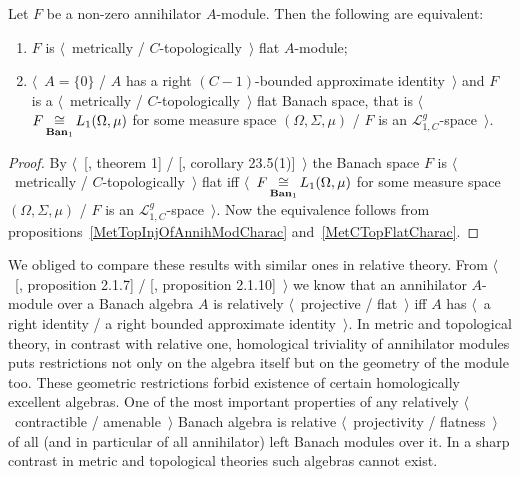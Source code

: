 \begin{proposition}\label{MetTopFlatAnnihModCharac} Let $F$ be a non-zero
annihilator $A$-module. Then the following are equivalent:

\begin{enumerate}[label = (\roman*)]
    \item $F$ is $\langle$~metrically / $C$-topologically~$\rangle$ flat
    $A$-module;

    \item $\langle$~$A= \{0 \}$ / $A$ has a right $(C-1)$-bounded approximate
    identity~$\rangle$ and $F$ is a $\langle$~metrically /
    $C$-topologically~$\rangle$ flat Banach space, that is
    $\langle$~$F\mathop{\mathbin{\cong}}\limits_{\mathbf{Ban}_1}L_1(\Omega,\mu)$ for some measure space
    $(\Omega, \Sigma, \mu)$ / $F$ is an $\mathscr{L}_{1,C}^g$-space~$\rangle$.
\end{enumerate}
\end{proposition}
\begin{proof} By $\langle$~[\cite{GrothMetrProjFlatBanSp}, theorem 1] /
[\cite{DefFloTensNorOpId}, corollary 23.5(1)]~$\rangle$ the Banach space $F$ is
$\langle$~metrically / $C$-topologically~$\rangle$ flat iff
$\langle$~$F\mathop{\mathbin{\cong}}\limits_{\mathbf{Ban}_1}L_1(\Omega,\mu)$ for some measure space
$(\Omega, \Sigma, \mu)$ / $F$ is an $\mathscr{L}_{1,C}^g$-space~$\rangle$. Now
the equivalence follows from propositions~\ref{MetTopInjOfAnnihModCharac}
and~\ref{MetCTopFlatCharac}.
\end{proof}

We obliged to compare these results with similar ones in relative theory. From
$\langle$~[\cite{RamsHomPropSemgroupAlg}, proposition 2.1.7] /
[\cite{RamsHomPropSemgroupAlg}, proposition 2.1.10]~$\rangle$ we know that an
annihilator $A$-module over a Banach algebra $A$ is relatively
$\langle$~projective / flat~$\rangle$ iff $A$ has $\langle$~a right identity / a
right bounded approximate identity~$\rangle$.   
In metric and topological theory, in contrast with relative one, homological
triviality of annihilator modules puts restrictions not only on the algebra
itself but on the geometry of the module too. These geometric restrictions
forbid existence of certain homologically excellent algebras. One of the most
important properties of any relatively $\langle$~contractible / amenable~$\rangle$
Banach algebra is relative $\langle$~projectivity / flatness~$\rangle$ of all (and in
particular of all annihilator) left Banach modules over it. In a sharp contrast
in metric and topological theories such algebras cannot exist.

